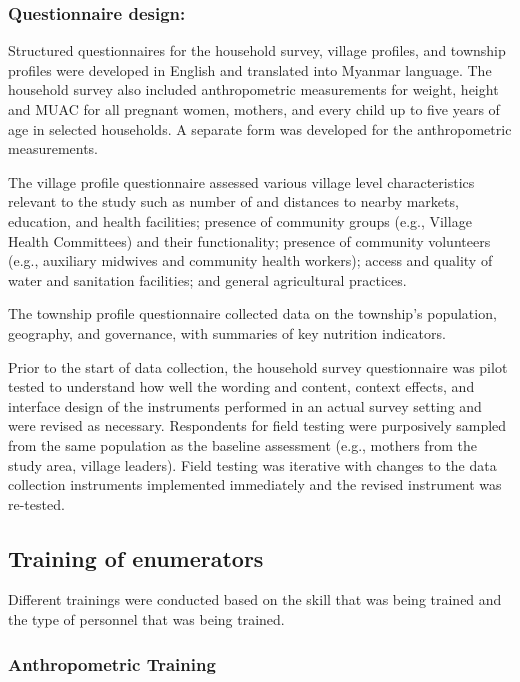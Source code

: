 \documentclass[12pt,a4paper]{article}
\begin{document}
\hypertarget{questionnaire-design}{%
\subsubsection{Questionnaire design:}\label{questionnaire-design}}

Structured questionnaires for the household survey, village profiles, and township profiles were developed in English and translated into Myanmar language. The household survey also included anthropometric measurements for weight, height and MUAC for all pregnant women, mothers, and every child up to five years of age in selected households. A separate form was developed for the anthropometric measurements.

The village profile questionnaire assessed various village level characteristics relevant to the study such as number of and distances to nearby markets, education, and health facilities; presence of community groups (e.g., Village Health Committees) and their functionality; presence of community volunteers (e.g., auxiliary midwives and community health workers); access and quality of water and sanitation facilities; and general agricultural practices.

The township profile questionnaire collected data on the township's population, geography, and governance, with summaries of key nutrition indicators.

Prior to the start of data collection, the household survey questionnaire was pilot tested to understand how well the wording and content, context effects, and interface design of the instruments performed in an actual survey setting and were revised as necessary. Respondents for field testing were purposively sampled from the same population as the baseline assessment (e.g., mothers from the study area, village leaders). Field testing was iterative with changes to the data collection instruments implemented immediately and the revised instrument was re-tested.

\hypertarget{training}{%
\subsection{Training of enumerators}\label{training}}

Different trainings were conducted based on the skill that was being trained and the type of personnel that was being trained.

\hypertarget{anthro-training}{%
\subsubsection{Anthropometric Training}\label{anthro-training}}
\end{document}
